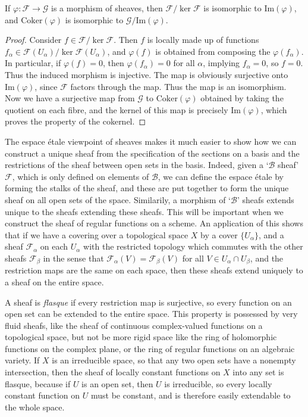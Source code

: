 \begin{theorem}
    If $\varphi: \mathcal{F} \to \mathcal{G}$ is a morphism of sheaves, then $\mathcal{F} / \ker \mathcal{F}$ is isomorphic to $\text{Im}(\varphi)$, and $\text{Coker}(\varphi)$ is isomorphic to $\mathcal{G} / \text{Im}(\varphi)$.
\end{theorem}
\begin{proof}
    Consider $f \in \mathcal{F} / \ker \mathcal{F}$. Then $f$ is locally made up of functions $f_\alpha \in \mathcal{F}(U_\alpha) / \ker \mathcal{F}(U_\alpha)$, and $\varphi(f)$ is obtained from composing the $\varphi(f_\alpha)$. In particular, if $\varphi(f) = 0$, then $\varphi(f_\alpha) = 0$ for all $\alpha$, implying $f_\alpha = 0$, so $f = 0$. Thus the induced morphism is injective. The map is obviously surjective onto $\text{Im}(\varphi)$, since $\mathcal{F}$ factors through the map. Thus the map is an isomorphism. Now we have a surjective map from $\mathcal{G}$ to $\text{Coker}(\varphi)$ obtained by taking the quotient on each fibre, and the kernel of this map is precisely $\text{Im}(\varphi)$, which proves the property of the cokernel.
\end{proof}

The espace \'{e}tale viewpoint of sheaves makes it much easier to show how we can construct a unique sheaf from the specification of the sections on a basis and the restrictions of the sheaf between open sets in the basis. Indeed, given a `$\mathcal{B}$ sheaf' $\mathcal{F}$, which is only defined on elements of $\mathcal{B}$, we can define the espace \'{e}tale by forming the stalks of the sheaf, and these are put together to form the unique sheaf on all open sets of the space. Similarily, a morphism of `$\mathcal{B}$' sheafs extends unique to the sheafs extending these sheafs. This will be important when we construct the sheaf of regular functions on a scheme. An application of this shows that if we have a covering over a topological space $X$ by a cover $\{ U_\alpha \}$, and a sheaf $\mathcal{F}_\alpha$ on each $U_\alpha$ with the restricted topology which commutes with the other sheafs $\mathcal{F}_\beta$ in the sense that $\mathcal{F}_\alpha(V) = \mathcal{F}_\beta(V)$ for all $V \in U_\alpha \cap U_\beta$, and the restriction maps are the same on each space, then these sheafs extend uniquely to a sheaf on the entire space.

A sheaf is \emph{flasque} if every restriction map is surjective, so every function on an open set can be extended to the entire space. This property is possessed by very fluid sheafs, like the sheaf of continuous complex-valued functions on a topological space, but not be more rigid space like the ring of holomorphic functions on the complex plane, or the ring of regular functions on an algebraic variety. If $X$ is an irreducible space, so that any two open sets have a nonempty intersection, then the sheaf of locally constant functions on $X$ into any set is flasque, because if $U$ is an open set, then $U$ is irreducible, so every locally constant function on $U$ must be constant, and is therefore easily extendable to the whole space.

